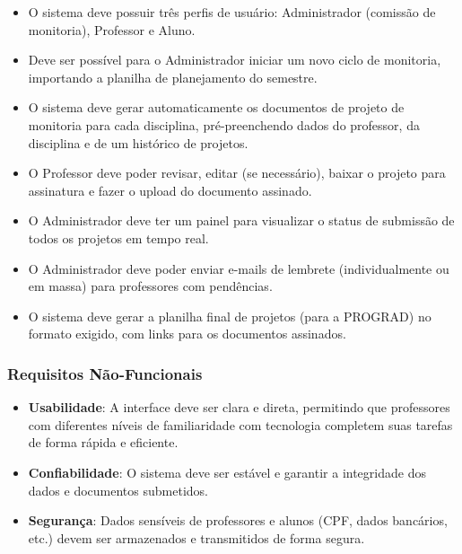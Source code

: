 \documentclass[12pt, a4paper]{report}
\begin{document}
\begin{itemize}
    \item O sistema deve possuir três perfis de usuário: Administrador (comissão de monitoria), Professor e Aluno.
    
    \item Deve ser possível para o Administrador iniciar um novo ciclo de monitoria, importando a planilha de planejamento do semestre.
    
    \item O sistema deve gerar automaticamente os documentos de projeto de monitoria para cada disciplina, pré-preenchendo dados do professor, da disciplina e de um histórico de projetos.
    
    \item O Professor deve poder revisar, editar (se necessário), baixar o projeto para assinatura e fazer o upload do documento assinado.
    
    \item O Administrador deve ter um painel para visualizar o status de submissão de todos os projetos em tempo real.
    
    \item O Administrador deve poder enviar e-mails de lembrete (individualmente ou em massa) para professores com pendências.
    
    \item O sistema deve gerar a planilha final de projetos (para a PROGRAD) no formato exigido, com links para os documentos assinados.
\end{itemize}

\subsubsection{Requisitos Não-Funcionais}

\begin{itemize}
    \item \textbf{Usabilidade}: A interface deve ser clara e direta, permitindo que professores com diferentes níveis de familiaridade com tecnologia completem suas tarefas de forma rápida e eficiente.
    
    \item \textbf{Confiabilidade}: O sistema deve ser estável e garantir a integridade dos dados e documentos submetidos.
    
    \item \textbf{Segurança}: Dados sensíveis de professores e alunos (CPF, dados bancários, etc.) devem ser armazenados e transmitidos de forma segura.
\end{itemize}
\end{document}
